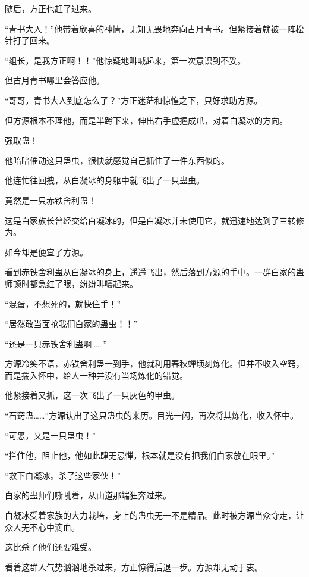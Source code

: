 
\begin{this_body}

随后，方正也赶了过来。

“青书大人！”他带着欣喜的神情，无知无畏地奔向古月青书。但紧接着就被一阵松针打了回来。

“组长，是我方正啊！！”他惊疑地叫喊起来，第一次意识到不妥。

但古月青书哪里会答应他。

“哥哥，青书大人到底怎么了？”方正迷茫和惊惶之下，只好求助方源。

但方源根本不理他，而是半蹲下来，伸出右手虚握成爪，对着白凝冰的方向。

强取蛊！

他暗暗催动这只蛊虫，很快就感觉自己抓住了一件东西似的。

他连忙往回拽，从白凝冰的身躯中就飞出了一只蛊虫。

竟然是一只赤铁舍利蛊！

这是白家族长曾经交给白凝冰的，但是白凝冰并未使用它，就迅速地达到了三转修为。

如今却是便宜了方源。

看到赤铁舍利蛊从白凝冰的身上，遥遥飞出，然后落到方源的手中。一群白家的蛊师顿时都急红了眼，纷纷叫嚷起来。

“混蛋，不想死的，就快住手！”

“居然敢当面抢我们白家的蛊虫！！”

“还是一只赤铁舍利蛊啊……”

方源冷笑不语，赤铁舍利蛊一到手，他就利用春秋蝉顷刻炼化。但并不收入空窍，而是揣入怀中，给人一种并没有当场炼化的错觉。

他紧接着又抓，这一次飞出了一只灰色的甲虫。

“石窍蛊……”方源认出了这只蛊虫的来历。目光一闪，再次将其炼化，收入怀中。

“可恶，又是一只蛊虫！”

“拦住他，阻止他，他如此肆无忌惮，根本就是没有把我们白家放在眼里。”

“救下白凝冰。杀了这些家伙！”

白家的蛊师们嘶吼着，从山道那端狂奔过来。

白凝冰受着家族的大力栽培，身上的蛊虫无一不是精品。此时被方源当众夺走，让众人无不心中滴血。

这比杀了他们还要难受。

看着这群人气势汹汹地杀过来，方正惊得后退一步。方源却无动于衷。


\end{this_body}
